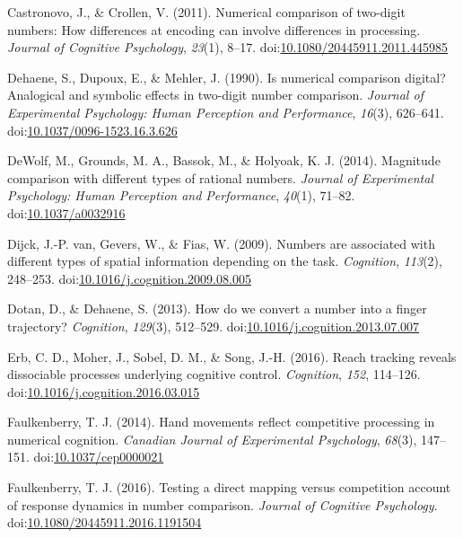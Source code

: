 \documentclass[english,man]{apa6}
\theoremstyle{definition}
\theoremstyle{definition}
\theoremstyle{definition}
\theoremstyle{remark}
\begin{document}
\setlength{\parindent}{-0.5in} \setlength{\leftskip}{0.5in}

\hypertarget{refs}{}
\hypertarget{ref-castronovo2011}{}
Castronovo, J., \& Crollen, V. (2011). Numerical comparison of two-digit
numbers: How differences at encoding can involve differences in
processing. \emph{Journal of Cognitive Psychology}, \emph{23}(1), 8--17.
doi:\href{https://doi.org/10.1080/20445911.2011.445985}{10.1080/20445911.2011.445985}

\hypertarget{ref-dehaene1990}{}
Dehaene, S., Dupoux, E., \& Mehler, J. (1990). Is numerical comparison
digital? Analogical and symbolic effects in two-digit number comparison.
\emph{Journal of Experimental Psychology: Human Perception and
Performance}, \emph{16}(3), 626--641.
doi:\href{https://doi.org/10.1037/0096-1523.16.3.626}{10.1037/0096-1523.16.3.626}

\hypertarget{ref-dewolf2014}{}
DeWolf, M., Grounds, M. A., Bassok, M., \& Holyoak, K. J. (2014).
Magnitude comparison with different types of rational numbers.
\emph{Journal of Experimental Psychology: Human Perception and
Performance}, \emph{40}(1), 71--82.
doi:\href{https://doi.org/10.1037/a0032916}{10.1037/a0032916}

\hypertarget{ref-vanDijck2009}{}
Dijck, J.-P. van, Gevers, W., \& Fias, W. (2009). Numbers are associated
with different types of spatial information depending on the task.
\emph{Cognition}, \emph{113}(2), 248--253.
doi:\href{https://doi.org/10.1016/j.cognition.2009.08.005}{10.1016/j.cognition.2009.08.005}

\hypertarget{ref-dotan2013}{}
Dotan, D., \& Dehaene, S. (2013). How do we convert a number into a
finger trajectory? \emph{Cognition}, \emph{129}(3), 512--529.
doi:\href{https://doi.org/10.1016/j.cognition.2013.07.007}{10.1016/j.cognition.2013.07.007}

\hypertarget{ref-erb2016}{}
Erb, C. D., Moher, J., Sobel, D. M., \& Song, J.-H. (2016). Reach
tracking reveals dissociable processes underlying cognitive control.
\emph{Cognition}, \emph{152}, 114--126.
doi:\href{https://doi.org/10.1016/j.cognition.2016.03.015}{10.1016/j.cognition.2016.03.015}

\hypertarget{ref-faulkenberry2014}{}
Faulkenberry, T. J. (2014). Hand movements reflect competitive
processing in numerical cognition. \emph{Canadian Journal of
Experimental Psychology}, \emph{68}(3), 147--151.
doi:\href{https://doi.org/10.1037/cep0000021}{10.1037/cep0000021}

\hypertarget{ref-faulkenberry2016}{}
Faulkenberry, T. J. (2016). Testing a direct mapping versus competition
account of response dynamics in number comparison. \emph{Journal of
Cognitive Psychology}.
doi:\href{https://doi.org/10.1080/20445911.2016.1191504}{10.1080/20445911.2016.1191504}
\end{document}
